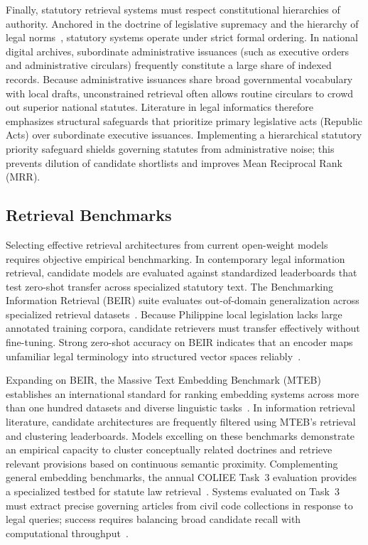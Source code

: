     Finally, statutory retrieval systems must respect constitutional hierarchies of authority. Anchored in the doctrine of legislative supremacy and the hierarchy of legal norms~\cite{kelsen1967pure, philgov1991ra7160}, statutory systems operate under strict formal ordering. In national digital archives, subordinate administrative issuances (such as executive orders and administrative circulars) frequently constitute a large share of indexed records. Because administrative issuances share broad governmental vocabulary with local drafts, unconstrained retrieval often allows routine circulars to crowd out superior national statutes. Literature in legal informatics therefore emphasizes structural safeguards that prioritize primary legislative acts (Republic Acts) over subordinate executive issuances. Implementing a hierarchical statutory priority safeguard shields governing statutes from administrative noise; this prevents dilution of candidate shortlists and improves Mean Reciprocal Rank (MRR).

    \subsection{Retrieval Benchmarks}
    Selecting effective retrieval architectures from current open-weight models requires objective empirical benchmarking. In contemporary legal information retrieval, candidate models are evaluated against standardized leaderboards that test zero-shot transfer across specialized statutory text. The Benchmarking Information Retrieval (BEIR) suite evaluates out-of-domain generalization across specialized retrieval datasets~\cite{thakur2021beir}. Because Philippine local legislation lacks large annotated training corpora, candidate retrievers must transfer effectively without fine-tuning. Strong zero-shot accuracy on BEIR indicates that an encoder maps unfamiliar legal terminology into structured vector spaces reliably~\cite{thakur2021beir}.

    Expanding on BEIR, the Massive Text Embedding Benchmark (MTEB) establishes an international standard for ranking embedding systems across more than one hundred datasets and diverse linguistic tasks~\cite{muennighoff2023mteb}. In information retrieval literature, candidate architectures are frequently filtered using MTEB's retrieval and clustering leaderboards. Models excelling on these benchmarks demonstrate an empirical capacity to cluster conceptually related doctrines and retrieve relevant provisions based on continuous semantic proximity. Complementing general embedding benchmarks, the annual COLIEE Task~3 evaluation provides a specialized testbed for statute law retrieval~\cite{coliee2025proceedings, coliee2026proceedings}. Systems evaluated on Task~3 must extract precise governing articles from civil code collections in response to legal queries; success requires balancing broad candidate recall with computational throughput~\cite{wu2025aiir, goebel2026an}.

